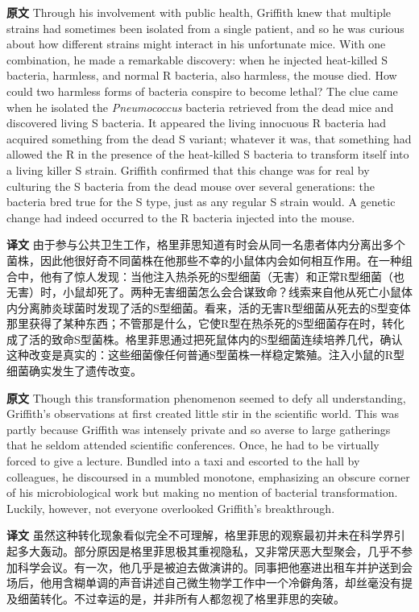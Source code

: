 \documentclass[UTF8,zihao=-4]{ctexart}
\newcommand{\BodyFont}{\fontsize{10.5pt}{15.5pt}\selectfont}
\renewenvironment{quote}{\par\noindent\begingroup\BodyFont}{\par\endgroup}
\begin{document}
\begin{quote}
\noindent\textbf{原文} Through his involvement with public health, Griffith knew that multiple strains had sometimes been isolated from a single patient, and so he was curious about how different strains might interact in his unfortunate mice. With one combination, he made a remarkable discovery: when he injected heat-killed S bacteria, harmless, and normal R bacteria, also harmless, the mouse died. How could two harmless forms of bacteria conspire to become lethal? The clue came when he isolated the \emph{Pneumococcus} bacteria retrieved from the dead mice and discovered living S bacteria. It appeared the living innocuous R bacteria had acquired something from the dead S variant; whatever it was, that something had allowed the R in the presence of the heat-killed S bacteria to transform itself into a living killer S strain. Griffith confirmed that this change was for real by culturing the S bacteria from the dead mouse over several generations: the bacteria bred true for the S type, just as any regular S strain would. A genetic change had indeed occurred to the R bacteria injected into the mouse.

\smallskip
\noindent\textbf{译文} 由于参与公共卫生工作，格里菲思知道有时会从同一名患者体内分离出多个菌株，因此他很好奇不同菌株在他那些不幸的小鼠体内会如何相互作用。在一种组合中，他有了惊人发现：当他注入热杀死的S型细菌（无害）和正常R型细菌（也无害）时，小鼠却死了。两种无害细菌怎么会合谋致命？线索来自他从死亡小鼠体内分离肺炎球菌时发现了活的S型细菌。看来，活的无害R型细菌从死去的S型变体那里获得了某种东西；不管那是什么，它使R型在热杀死的S型细菌存在时，转化成了活的致命S型菌株。格里菲思通过把死鼠体内的S型细菌连续培养几代，确认这种改变是真实的：这些细菌像任何普通S型菌株一样稳定繁殖。注入小鼠的R型细菌确实发生了遗传改变。
\end{quote}

\begin{quote}
\noindent\textbf{原文} Though this transformation phenomenon seemed to defy all understanding, Griffith's observations at first created little stir in the scientific world. This was partly because Griffith was intensely private and so averse to large gatherings that he seldom attended scientific conferences. Once, he had to be virtually forced to give a lecture. Bundled into a taxi and escorted to the hall by colleagues, he discoursed in a mumbled monotone, emphasizing an obscure corner of his microbiological work but making no mention of bacterial transformation. Luckily, however, not everyone overlooked Griffith's breakthrough.

\smallskip
\noindent\textbf{译文} 虽然这种转化现象看似完全不可理解，格里菲思的观察最初并未在科学界引起多大轰动。部分原因是格里菲思极其重视隐私，又非常厌恶大型聚会，几乎不参加科学会议。有一次，他几乎是被迫去做演讲的。同事把他塞进出租车并护送到会场后，他用含糊单调的声音讲述自己微生物学工作中一个冷僻角落，却丝毫没有提及细菌转化。不过幸运的是，并非所有人都忽视了格里菲思的突破。
\end{quote}
\end{document}
